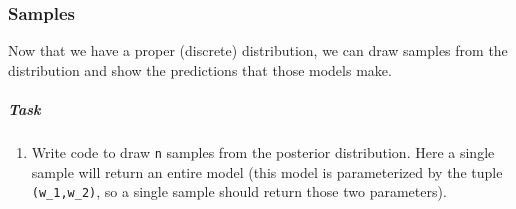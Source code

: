 \documentclass[11pt]{article}
\providecommand{\tightlist}{%
      \setlength{\itemsep}{0pt}\setlength{\parskip}{0pt}}
\begin{document}
    \subsubsection{Samples}\label{samples}

Now that we have a proper (discrete) distribution, we can draw samples
from the distribution and show the predictions that those models make.

\subparagraph{Task}\label{task}

\begin{enumerate}
\def\labelenumi{\arabic{enumi}.}
\tightlist
\item
  Write code to draw \texttt{n} samples from the posterior distribution.
  Here a single sample will return an entire model (this model is
  parameterized by the tuple \texttt{(w\_1,w\_2)}, so a single sample
  should return those two parameters).
\end{enumerate}
\end{document}
